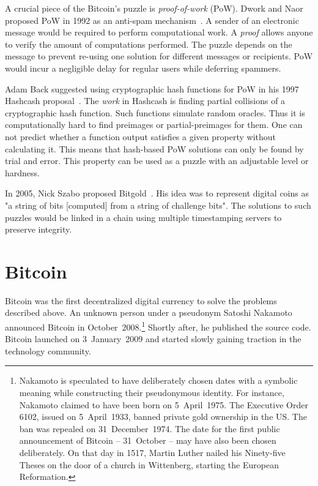 A crucial piece of the Bitcoin's puzzle is \textit{proof-of-work} (PoW).
Dwork and Naor proposed PoW in 1992 as an anti-spam mechanism~\cite{Dwork1992}.
A sender of an electronic message would be required to perform computational work.
A \textit{proof} allows anyone to verify the amount of computations performed.
The puzzle depends on the message to prevent re-using one solution for different messages or recipients.
PoW would incur a negligible delay for regular users while deferring spammers.

Adam Back suggested using cryptographic hash functions for PoW in his 1997 Hashcash proposal~\cite{Back1997}.
The \textit{work} in Hashcash is finding partial collisions of a cryptographic hash function.
Such functions simulate random oracles.
Thus it is computationally hard to find preimages or partial-preimages for them.
One can not predict whether a function output satisfies a given property without calculating it.
This means that hash-based PoW solutions can only be found by trial and error.
This property can be used as a puzzle with an adjustable level or hardness.

In 2005, Nick Szabo proposed Bitgold~\cite{Szabo2005}.
His idea was to represent digital coins as "a string of bits [computed] from a string of challenge bits".
The solutions to such puzzles would be linked in a chain using multiple timestamping servers to preserve integrity.


\section{Bitcoin}

Bitcoin was the first decentralized digital currency to solve the problems described above.
An unknown person under a pseudonym Satoshi Nakamoto announced Bitcoin in October~2008.\footnote{Nakamoto is speculated to have deliberately chosen dates with a symbolic meaning while constructing their pseudonymous identity. For instance, Nakamoto claimed to have been born on 5~April~1975. The Executive Order 6102, issued on 5~April~1933, banned private gold ownership in the US. The ban was repealed on 31~December~1974. The date for the first public announcement of Bitcoin -- 31~October -- may have also been chosen deliberately. On that day in 1517, Martin Luther nailed his Ninety-five Theses on the door of a church in Wittenberg, starting the European Reformation.}
Shortly after, he published the source code.
Bitcoin launched on 3~January~2009 and started slowly gaining traction in the technology community.

